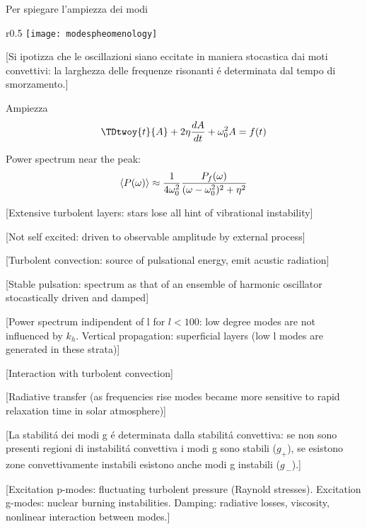 \documentclass[../main.tex]{subfiles}
\begin{document}
Per spiegare l'ampiezza dei modi 

\begin{wrapfigure}{r}{0.5\textwidth}
\centering
\texttt{[image: modespheomenology]}
\caption{Larghezza della risonanza, potenza ed energia totale. Da \cite{libbrecht1988solar}.}\label{fig:modespheomenology}
\end{wrapfigure}

[Si ipotizza che le oscillazioni siano eccitate in maniera stocastica dai moti convettivi: la larghezza delle frequenze risonanti \'e determinata dal tempo di smorzamento.]

Ampiezza
\begin{align}
&\TDtwoy{t}{A}+2\eta\TDy{t}{A}+\omega_0^2A=f(t)\\
\end{align}

Power spectrum near the peak:
\begin{align}
\langle P(\omega) \rangle\approx\frac{1}{4\omega_0^2}\frac{P_f(\omega)}{(\omega-\omega_0^2)^2+\eta^2}
\end{align}

[Extensive turbolent layers: stars lose all hint of vibrational instability]

[Not self excited: driven to observable amplitude by external process]

[Turbolent convection: source of pulsational energy, emit acustic radiation]

[Stable pulsation: spectrum as that of an ensemble of harmonic oscillator stocastically driven and damped]

[Power spectrum indipendent of l for $l<100$: low degree modes are not influenced by $k_h$. Vertical propagation: superficial layers (low l modes are generated in these strata)]


[Interaction with turbolent convection]

[Radiative transfer (as frequencies rise modes became more sensitive to rapid relaxation time in solar atmosphere)]

[La stabilit\'a dei modi g \'e determinata dalla stabilit\'a convettiva: se non sono presenti regioni di instabilit\'a convettiva i modi g sono stabili ($g_+$), se esistono zone convettivamente instabili esistono anche modi g instabili ($g_{\,-}$).]

[Excitation p-modes: fluctuating turbolent pressure (Raynold stresses). Excitation g-modes: nuclear burning instabilities. Damping: radiative losses, viscosity, nonlinear interaction between modes.]
\end{document}
